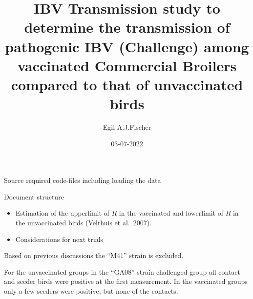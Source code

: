 \documentclass[
  ignorenonframetext,
]{beamer}
\title{IBV Transmission study to determine the transmission of
pathogenic IBV (Challenge) among vaccinated Commercial Broilers compared
to that of unvaccinated birds}
\author{Egil A.J.Fischer}
\date{03-07-2022}
\providecommand{\tightlist}{%
  \setlength{\itemsep}{0pt}\setlength{\parskip}{0pt}}
\begin{document}
\frame{\titlepage}

\begin{frame}
Source required code-files including loading the data
\end{frame}

\begin{frame}{Document structure}
\protect\hypertarget{document-structure}{}
\begin{itemize}
\tightlist
\item
  Estimation of the upperlimit of \(R\) in the vaccinated and lowerlimit
  of \(R\) in the unvaccinated birds (Velthuis et al.~2007).
\item
  Considerations for next trials
\end{itemize}

Based on previous discussions the ``M41'' strain is excluded.

For the unvaccinated groups in the ``GA08'' strain challenged group all
contact and seeder birds were positive at the first measurement. In the
vaccinated groups only a few seeders were positive, but none of the
contacts.
\end{frame}
\end{document}
